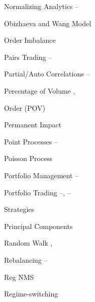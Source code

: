 \begin{multicols}{2}
{Normalizing Analytics \hfill \pageref{in:norm1}--\pageref{in:norm2} \pspace





Obizhaeva and Wang Model \hfill \pageref{in:ob_wang_mod} \par

Order Imbalance \hfill \pageref{in:imbalance} \pspace





Pairs Trading \hfill \pageref{in:pairs1}--\pageref{in:pairs2} \par

Partial/Auto Correlations \hfill \pageref{in:partac1}--\pageref{in:partac2} \par

Percentage of Volume \hfill \pageref{in:pov1}, \pageref{in:pov2} \par \hspace{0.25cm} Order (POV) \par

Permanent Impact \hfill \pageref{in:permimp} \par

Point Processes \hfill \pageref{in:point1}--\pageref{in:point2} \par

Poisson Process \hfill \pageref{in:poisson} \par

Portfolio Management \hfill \pageref{in:portman1}--\pageref{in:portman2} \par

Portfolio Trading \hfill \pageref{in:ports1}--\pageref{in:ports2}, \pageref{in:ports3}--\pageref{in:ports4} \par \hspace{0.25cm} Strategies \par

Principal Components \hfill \pageref{in:pca} \pspace





Random Walk \hfill \pageref{in:random1}, \pageref{in:random2} \par

Rebalancing \hfill \pageref{in:rebalance1}--\pageref{in:rebalance2} \par

Reg NMS \hfill \pageref{in:regnms} \par

Regime-switching \hfill \pageref{in:regime} \par

}
\end{multicols}
